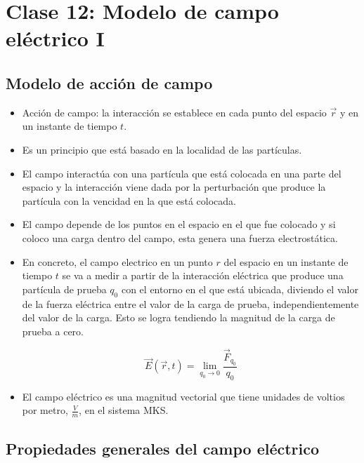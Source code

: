 \documentclass[a4paper,10pt]{article}
\begin{document}

\section*{Clase 12: Modelo de campo el\'ectrico I}

\subsection*{Modelo de acci\'on de campo}

\begin{itemize}

\item Acci\'on de campo: la interacci\'on se establece en cada punto del espacio $\vec{r}$ y en un
instante de tiempo $t$.

\item Es un principio que est\'a basado en la localidad de las part\'iculas.

\item El campo interact\'ua con una part\'icula que est\'a colocada en una parte del espacio y la
interacci\'on viene dada por la perturbaci\'on que produce la part\'icula con la vencidad
en la que est\'a colocada.

\item El campo depende de los puntos en el espacio en el que fue colocado y si coloco una carga dentro del campo,
esta genera una fuerza electrost\'atica.

\item En concreto, el campo electrico en un punto $r$ del espacio en un instante de tiempo $t$ se va
a medir a partir de la interacción el\'ectrica que produce una part\'icula de prueba $q_0$ con el
entorno en el que est\'a ubicada, diviendo el valor de la fuerza el\'ectrica entre el valor
de la carga de prueba, independientemente del valor de la carga. Esto se logra tendiendo
la magnitud de la carga de prueba a cero.

\begin{equation*}
    \boxed{\vec{E}(\vec{r},t)=\lim_{q_0\to0}\frac{\vec{F}_{q_0}}{q_0}}
\end{equation*}

\item El campo el\'ectrico es una magnitud vectorial que tiene unidades de voltios por
metro, $\frac{V}{m}$, en el sistema MKS.

\end{itemize}

\subsection*{Propiedades generales del campo el\'ectrico}
\end{document}
